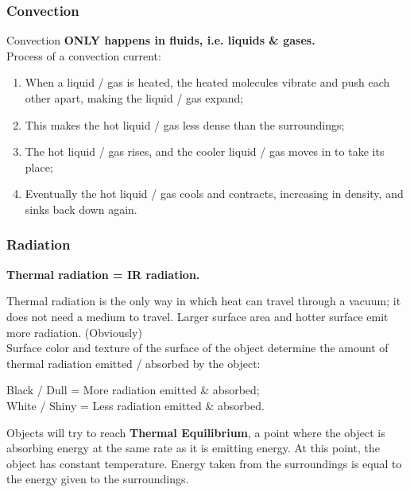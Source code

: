 \documentclass[a4paper,12pt]{article}
\begin{document}
\subsubsection{Convection}
Convection \textbf{ONLY happens in fluids, i.e. liquids \& gases.} \\Process of a convection current:
\begin{enumerate}
    \item When a liquid / gas is heated, the heated molecules vibrate and push each other apart, making the liquid / gas expand;
    \item This makes the hot liquid / gas less dense than the surroundings;
    \item The hot liquid / gas rises, and the cooler liquid / gas moves in to take its place;
    \item Eventually the hot liquid / gas cools and contracts, increasing in density, and sinks back down again.
\end{enumerate}
\subsubsection{Radiation}
\begin{center}\textbf{Thermal radiation = IR radiation.}\end{center}
Thermal radiation is the only way in which heat can travel through a vacuum; it does not need a medium to travel. Larger surface area and hotter surface emit more radiation. (Obviously)\\
Surface color and texture of the surface of the object determine the amount of thermal radiation emitted / absorbed by the object: \begin{center}Black / Dull = More radiation emitted \& absorbed;\\ White / Shiny = Less radiation emitted \& absorbed.
\end{center}
Objects will try to reach \textbf{Thermal Equilibrium}, a point where the object is absorbing energy at the same rate as it is emitting energy. At this point, the object has constant temperature. Energy taken from the surroundings is equal to the energy given to the surroundings.
\end{document}
